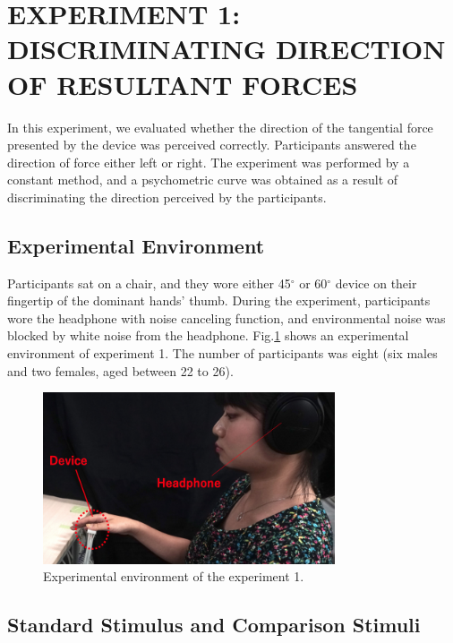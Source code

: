 \section{EXPERIMENT 1: DISCRIMINATING DIRECTION OF RESULTANT FORCES}

In this experiment, we evaluated whether the direction of the tangential force presented by the device was perceived correctly.
Participants answered the direction of force either left or right.
The experiment was performed by a constant method, and a psychometric curve was obtained as a result of discriminating the direction perceived by the participants.

\subsection{Experimental Environment}

Participants sat on a chair, and they wore either 45$^{\circ}$ or 60$^{\circ}$ device on their fingertip of the dominant hands'{} thumb. 
During the experiment, participants wore the headphone with noise canceling function, and environmental noise was blocked by white noise from the headphone.
Fig.\ref{fig_ex1_environment} shows an experimental environment of experiment 1. 
The number of participants was eight (six males and two females, aged between 22 to 26).

\begin{figure}[h]
  \centering
  \includegraphics[width=3.4in]{images/fig_ex1_environment.png}
  \caption{Experimental environment of the experiment 1.}
  \label{fig_ex1_environment}
\end{figure}

\subsection{Standard Stimulus and Comparison Stimuli}

